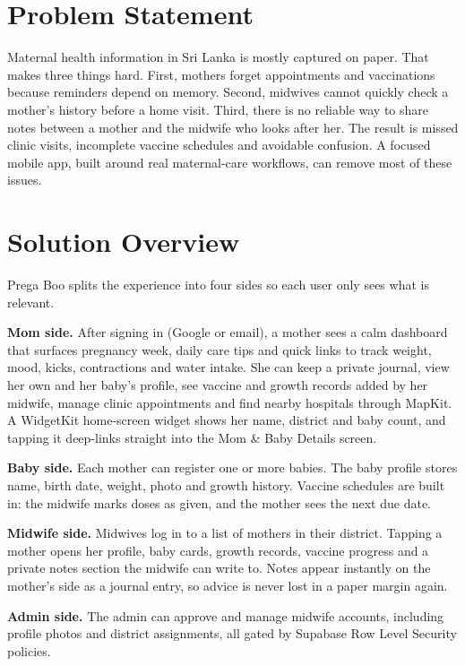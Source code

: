 \documentclass[12pt,a4paper]{article}
\begin{document}
\section{Problem Statement}
Maternal health information in Sri Lanka is mostly captured on paper. That makes three things hard. First, mothers forget appointments and vaccinations because reminders depend on memory. Second, midwives cannot quickly check a mother's history before a home visit. Third, there is no reliable way to share notes between a mother and the midwife who looks after her. The result is missed clinic visits, incomplete vaccine schedules and avoidable confusion. A focused mobile app, built around real maternal-care workflows, can remove most of these issues.

\section{Solution Overview}
Prega Boo splits the experience into four sides so each user only sees what is relevant.

\textbf{Mom side.} After signing in (Google or email), a mother sees a calm dashboard that surfaces pregnancy week, daily care tips and quick links to track weight, mood, kicks, contractions and water intake. She can keep a private journal, view her own and her baby's profile, see vaccine and growth records added by her midwife, manage clinic appointments and find nearby hospitals through MapKit. A WidgetKit home-screen widget shows her name, district and baby count, and tapping it deep-links straight into the Mom \& Baby Details screen.

\textbf{Baby side.} Each mother can register one or more babies. The baby profile stores name, birth date, weight, photo and growth history. Vaccine schedules are built in: the midwife marks doses as given, and the mother sees the next due date.

\textbf{Midwife side.} Midwives log in to a list of mothers in their district. Tapping a mother opens her profile, baby cards, growth records, vaccine progress and a private notes section the midwife can write to. Notes appear instantly on the mother's side as a journal entry, so advice is never lost in a paper margin again.

\textbf{Admin side.} The admin can approve and manage midwife accounts, including profile photos and district assignments, all gated by Supabase Row Level Security policies.
\end{document}
